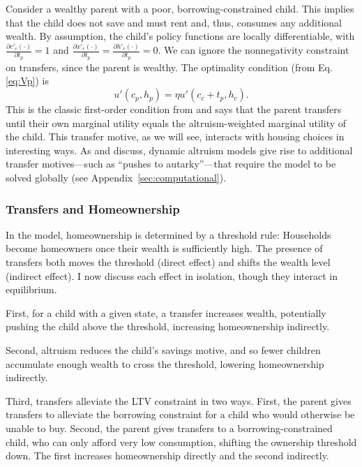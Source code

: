 \documentclass[12pt]{article}
\begin{document}
Consider a wealthy parent with a poor, borrowing-constrained child. This implies that the child does not save and must rent and, thus, consumes any additional wealth. By assumption, the child's policy functions are locally differentiable, with $\frac{\partial c'_c(\cdot)}{\partial t_p}=1$ and $\frac{\partial x'_c(\cdot)}{\partial t_p}=\frac{\partial h'_c(\cdot)}{\partial t_p}=0$. We can ignore the nonnegativity constraint on transfers, since the parent is wealthy. The optimality condition (from Eq. \ref{eq:Vp}) is
\begin{equation}\label{eq:FOC}
	u'(c_p,h_p) = \eta u'(c_c + t_p,h_c).
\end{equation}
This is the classic first-order condition from \cite{Altonji1997a} and says that the parent transfers until their own marginal utility equals the altruism-weighted marginal utility of the child. This transfer motive, as we will see, interacts with housing choices in interesting ways. As \citet{Barczyk2020a} and \citet{Chu2020} discuss, dynamic altruism models give rise to additional transfer motives---such as ``pushes to autarky''---that require the model to be solved globally (see Appendix~\ref{sec:computational}).

\subsubsection{Transfers and Homeownership}
In the model, homeownership is determined by a threshold rule: Households become homeowners once their wealth is sufficiently high. The presence of transfers both moves the threshold (direct effect) and shifts the wealth level (indirect effect). I now discuss each effect in isolation, though they interact in equilibrium.

First, for a child with a given state, a transfer increases wealth, potentially pushing the child above the threshold, increasing homeownership indirectly.

Second, altruism reduces the child's savings motive, and so fewer children accumulate enough wealth to cross the threshold, lowering homeownership indirectly.

Third, transfers alleviate the LTV constraint in two ways. First, the parent gives transfers to alleviate the borrowing constraint for a child who would otherwise be unable to buy. Second, the parent gives transfers to a borrowing-constrained child, who can only afford very low consumption, shifting the ownership threshold down. The first increases homeownership directly and the second indirectly.
\end{document}
